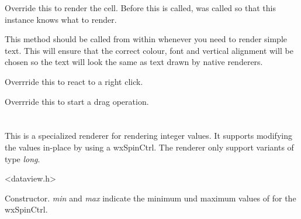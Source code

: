 Override this to render the cell. Before this is called,
 was called
so that this instance knows what to render.

\label{wxdataviewcustomrendererrender}


This method should be called from within 
whenever you need to render simple text. This will ensure that the
correct colour, font and vertical alignment will be chosen so the
text will look the same as text drawn by native renderers.

\label{wxdataviewcustomrendererrightclick}


Overrride this to react to a right click.

\label{wxdataviewcustomrendererstartdrag}


Overrride this to start a drag operation.


\section{}\label{wxdataviewspinrenderer}

This is a specialized renderer for rendering integer values. It
supports modifying the values in-place by using a wxSpinCtrl.
The renderer only support variants of type {\it long}.




<dataview.h>




\label{wxdataviewspinrendererwxdataviewspinrenderer}


Constructor. {\it min} and {\it max} indicate the minimum und
maximum values of for the wxSpinCtrl.

